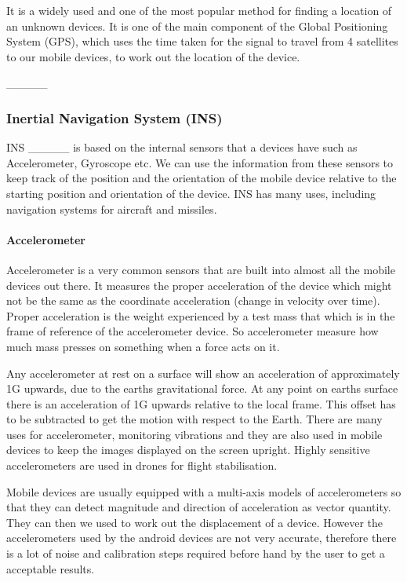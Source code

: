 It is a widely used and one of the most popular method for finding
a location of an unknown devices. It is one of the main component
of the Global Positioning System (GPS), which uses the time taken
for the signal to travel from 4 satellites to our mobile devices,
to work out the location of the device.

\_\_\_\_\_ 


\subsubsection{Inertial Navigation System (INS)}

INS \_\_\_\_\_ is based on the internal sensors that a devices have
such as Accelerometer, Gyroscope etc. We can use the information from
these sensors to keep track of the position and the orientation of
the mobile device relative to the starting position and orientation
of the device. INS has many uses, including navigation systems for
aircraft and missiles.


\paragraph{Accelerometer}

Accelerometer is a very common sensors that are built into almost
all the mobile devices out there. It measures the proper acceleration
of the device which might not be the same as the coordinate acceleration
(change in velocity over time). Proper acceleration is the weight
experienced by a test mass that which is in the frame of reference
of the accelerometer device. So accelerometer measure how much mass
presses on something when a force acts on it.

Any accelerometer at rest on a surface will show an acceleration of
approximately 1G upwards, due to the earths gravitational force. At
any point on earths surface there is an acceleration of 1G upwards
relative to the local frame. This offset has to be subtracted to get
the motion with respect to the Earth. There are many uses for accelerometer,
monitoring vibrations and they are also used in mobile devices to
keep the images displayed on the screen upright. Highly sensitive
accelerometers are used in drones for flight stabilisation.

Mobile devices are usually equipped with a multi-axis models of accelerometers
so that they can detect magnitude and direction of acceleration as
vector quantity. They can then we used to work out the displacement
of a device. However the accelerometers used by the android devices
are not very accurate, therefore there is a lot of noise and calibration
steps required before hand by the user to get a acceptable results.

